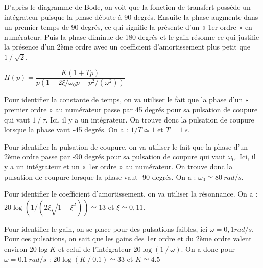 

\ifprof
\begin{corrige}
D’après le diagramme de Bode, on voit que la fonction de transfert possède un intégrateur puisque la phase débute à 90 degrés. Ensuite la phase augmente dans un premier temps de 90 degrés, ce qui signifie la présente d’un « 1er ordre » en numérateur. Puis la phase diminue de 180 degrés  et le gain résonne ce qui justifie la présence d’un 2ème ordre avec un coefficient d’amortissement plus petit que $1⁄\sqrt{2}$.

$H(p)=\dfrac{K(1+Tp)}{p(1+2\xi/\omega_0  p+p^2/(\omega^2 ))}$

Pour identifier la constante de temps, on va utiliser le fait que la phase d’un « premier ordre » au numérateur passe par 45 degrés pour sa pulsation de coupure qui vaut $1⁄\tau$.
Ici, il y a un intégrateur. On trouve donc la pulsation de coupure lorsque la phase vaut -45 degrés. On a :
$1/T\simeq 1$ et $T=\SI{1}{s}$.

Pour identifier la pulsation de coupure, on va utiliser le fait que la phase d’un 2ème ordre passe par -90 degrés pour sa pulsation de coupure qui vaut $\omega_0$.
Ici, il y a un intégrateur et un « 1er ordre » au numérateur. On trouve donc la pulsation de coupure lorsque la phase vaut -90 degrés. On a :
$\omega_0\simeq \SI{80}{rad/s}$.

Pour identifier le coefficient d’amortissement, on va utiliser la résonnance. On a :
$20\log(1/(2\xi\sqrt{1-\xi^2 }))\simeq 13$ et $\xi\simeq 0,11$.

Pour identifier le gain, on se place pour des pulsations faibles, ici $\omega=0,1 rad/s$. Pour ces pulsations, on sait que les gains des 1er ordre et du 2ème ordre valent environ $20\log K$ et celui de l’intégrateur $20\log(1⁄\omega)$. On a donc pour $\omega=\SI{0,1}{rad/s}$ :
$20\log(K⁄0.1)\simeq 33$ et $K\simeq4.5$

\end{corrige}
\else



